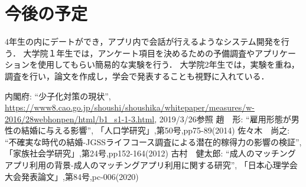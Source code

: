 \documentclass[12pt]{ltjsarticle}
\begin{document}
\section{今後の予定}
4年生の内にデートができ，アプリ内で会話が行えるようなシステム開発を行う．
大学院１年生では，アンケート項目を決めるための予備調査やアプリケーションを使用してもらい簡易的な実験を行う．
大学院2年生では，実験を重ね，調査を行い，論文を作成し，学会で発表することも視野に入れている．

\begin{thebibliography}{99}
 内閣府: ``少子化対策の現状'', \url{https://www8.cao.go.jp/shoushi/shoushika/whitepaper/measures/w-2016/28webhonpen/html/b1_s1-1-3.html}, 2019/3/26参照
 趙　形: ``雇用形態が男性の結婚に与える影響'', 「人口学研究」,第50号,pp75-89(2014)
 佐々木　尚之: ``不確実な時代の結婚-JGSSライフコース調査による潜在的稼得力の影響の検証'', 「家族社会学研究」,第24号,pp152-164(2012)
 古村　健太郎: ``成人のマッチングアプリ利用の背景-成人のマッチングアプリ利用に関する研究'', 「日本心理学会大会発表論文」,第84号,pc-006(2020)
\end{thebibliography}
\end{document}
